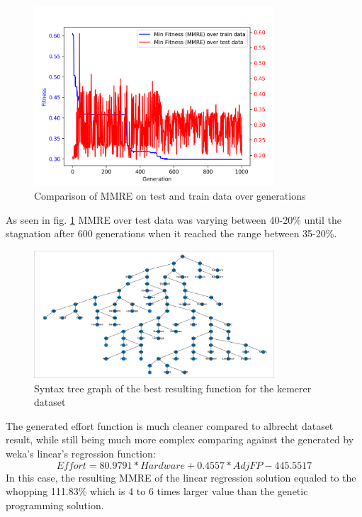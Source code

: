 \documentclass[12pt]{article}
\begin{document}
\begin{figure}[H]
  \centering
  \includegraphics[width=0.8\textwidth]{results/kemerer/mmre_train_vs_test}
  \caption{Comparison of MMRE on test and train data over generations}
  \label{train_test_kemerer}
\end{figure}
As seen in fig. \ref{train_test_kemerer} MMRE over test data was varying between 40-20\% until the stagnation after 600 generations when it reached the range between 35-20\%.

\begin{figure}[H]
  \centering
  \includegraphics[width=0.8\textwidth]{results/kemerer/test_function}
  \caption{Syntax tree graph of the best resulting function for the kemerer dataset}
  \label{function_kemerer}
\end{figure}

The generated effort function is much cleaner compared to albrecht dataset result, while still being much more complex comparing against the generated by weka's linear's regression function:
\begin{equation}
  Effort = 80.9791 * Hardware + 0.4557 * AdjFP -445.5517
\end{equation}
In this case, the resulting MMRE of the linear regression solution equaled to the whopping 111.83\% which is 4 to 6 times larger value than the genetic programming solution.
\end{document}
